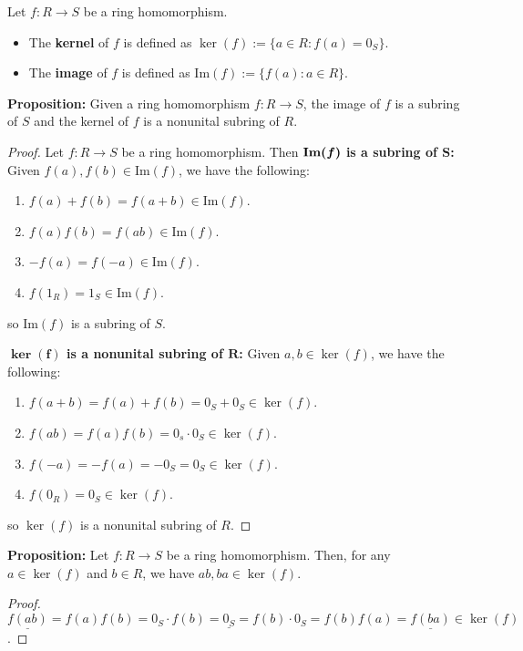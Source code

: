 \documentclass [12pt] {article}
\newenvironment{definition}[1]{\begin{tcolorbox}[title={Definition: #1},colback=blue!5!white,colframe=black!75!blue]}{\end{tcolorbox}}
\renewcommand{\bf}[1]{\textbf{{#1}}}
\newcommand{\ul}[1]{\underline{{#1}}}
\renewcommand{\Im}{\text{Im}}
\begin{document}
\begin{definition}{Kernel and Image}
    Let $f : R \to S$ be a ring homomorphism.
    \begin{itemize}[label=$\to$, leftmargin=*, itemsep=0em]
        \item The \bf{kernel} of $f$ is defined as $\ker(f) := \{ a \in R : f(a) = 0_S \}$.
        \item The \bf{image} of $f$ is defined as $\Im(f) := \{ f(a) : a \in R \}$.
    \end{itemize}
\end{definition}
\bf{Proposition:} Given a ring homomorphism $f : R \to S$, the image of $f$ is a subring of $S$
and the kernel of $f$ is a nonunital subring of $R$.
\begin{proof}
    Let $f : R \to S$ be a ring homomorphism. Then
    \newline
    $\bm{\bf{\Im}(f)}$ \bf{is a subring of $\bm{S}$:}
    Given $f(a), f(b) \in \Im(f)$, we have the following:
    \begin{enumerate}[label=(\arabic*)]
        \item $f(a) + f(b) = f(a + b) \in \Im(f)$.
        \item $f(a)f(b) = f(ab) \in \Im(f)$.
        \item $-f(a) = f(-a) \in \Im(f)$.
        \item $f(1_R) = 1_S \in \Im(f)$.
    \end{enumerate}
    so $\Im(f)$ is a subring of $S$.
    \vspace{1em}

    \bf{$\bm{\ker(f)}$ is a nonunital subring of $\bm{R}$:}
    Given $a, b \in \ker(f)$, we have the following:
    \begin{enumerate}[label=(\arabic*)]
        \item $f(a + b) = f(a) + f(b) = 0_S + 0_S \in \ker(f)$.
        \item $f(ab) = f(a)f(b) = 0_s \cdot 0_S \in \ker(f)$.
        \item $f(-a) = -f(a) = -0_S = 0_S \in \ker(f)$.
        \item $f(0_R) = 0_S \in \ker(f)$.
    \end{enumerate}
    so $\ker(f)$ is a nonunital subring of $R$.
\end{proof}
\bf{Proposition:} Let $f : R \to S$ be a ring homomorphism. Then, for any $a \in \ker(f)$ and
$b \in R$, we have $ab, ba \in \ker(f)$.
\begin{proof}
    $\ul{f(ab)} = f(a)f(b) = 0_S \cdot f(b) = \ul{0_S} = f(b) \cdot 0_S = f(b)f(a) = \ul{f(ba)} \in \ker(f)$.
\end{proof}
\end{document}
